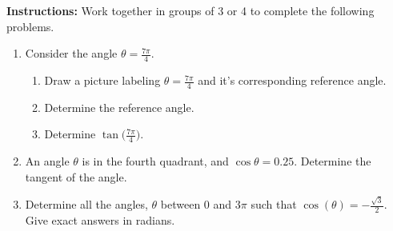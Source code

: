 


\noindent \textbf{Instructions:}  Work together in groups of  3 or 4 to complete the following problems.\\


\begin{enumerate}

\item Consider the angle $\displaystyle \theta=\frac{7\pi}{4}$.
\begin{enumerate}
\item  Draw a picture labeling $\displaystyle \theta=\frac{7\pi}{4}$ and it's corresponding reference angle.\\

\item Determine the reference angle.
\vfill
\item Determine $\displaystyle \tan\Big(\frac{7\pi}{4}\Big)$.
\end{enumerate}
\vfill

\newpage



\item An angle $\theta$ is in the fourth quadrant, and $\cos{\theta}=0.25$.  Determine the tangent of the angle.\vfill

\item Determine all the angles, $\theta$ between 0 and $3\pi$ such that $\cos{(\theta)}=-\frac{\sqrt{3}}{2}$.  Give exact answers in radians.\vfill





\end{enumerate}
